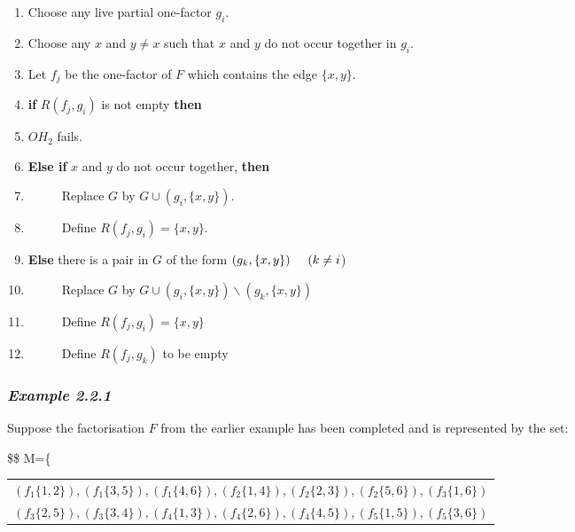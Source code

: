 \documentclass[
  12pt,
  a4paper]{book}
\begin{document}
\begin{enumerate}
\def\labelenumi{\arabic{enumi}.}
\item
  Choose any live partial one-factor \(g_i\).
\item
  Choose any \(x\) and \(y \neq x\) such that \(x\) and \(y\) do not occur
  together in \(g_i\).
\item
  Let \(f_j\) be the one-factor of \(F\) which contains the edge
  \(\{x,y\}\).
\item
  \textbf{if} \(R(f_j,g_i)\) is not empty \textbf{then}
\item
  \(OH_2\) fails.
\item
  \textbf{Else if} \(x\) and \(y\) do not occur together, \textbf{then}
\item
  \(\hspace{1cm}\) Replace \(G\) by \(G \cup (g_i,\{x,y\})\).
\item
  \(\hspace{1cm}\) Define \(R(f_j,g_i)=\{x,y\}\).
\item
  \textbf{Else} there is a pair in \(G\) of the form
  \((g_k,\{x,y\}) \hspace{0.5cm} (k \neq i\))
\item
  \(\hspace{1cm}\) Replace \(G\) by
  \(G \cup (g_i,\{x,y\}) \backslash (g_k,\{x,y\})\)
\item
  \(\hspace{1cm}\) Define \(R(f_j,g_i)=\{x,y\}\)
\item
  \(\hspace{1cm}\) Define \(R(f_j,g_k)\) to be empty
\end{enumerate}

\hypertarget{example-2.2.1}{%
\subsubsection{\texorpdfstring{\emph{Example 2.2.1}}{Example 2.2.1}}\label{example-2.2.1}}

Suppose the factorisation \(F\) from the earlier example has been
completed and is represented by the set:

\$\$ M=\{

\begin{longtable}[]{@{}l@{}}
\toprule
\endhead
\((f_1\{1,2\}),(f_1\{3,5\}),(f_1\{4,6\}),(f_2\{1,4\}),(f_2\{2,3\}),(f_2\{5,6\}),(f_3\{1,6\})\)\tabularnewline
\((f_3\{2,5\}),(f_3\{3,4\}),(f_4\{1,3\}),(f_4\{2,6\}),(f_4\{4,5\}),(f_5\{1,5\}),(f_5\{3,6\})\)\tabularnewline
\bottomrule
\end{longtable}
\end{document}
